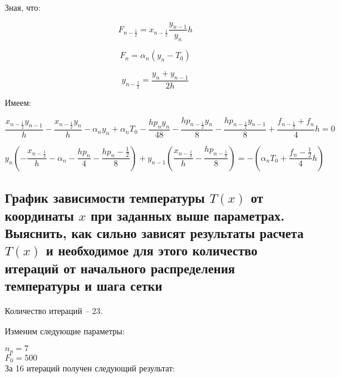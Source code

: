 Зная, что: 

\begin{equation*}
	F_{n - \frac{1}{2}} = x_{n - \frac{1}{2}} \frac{y_{n - 1}}{y_n}{h}
\end{equation*}

\begin{equation*}
	F_{n} = \alpha_{n}(y_{n} - T_{0})
\end{equation*}

\begin{equation*}
	y_{n - \frac{1}{2}} = \frac{y_{n} + y_{n - 1}}{2h}
\end{equation*}

Имеем:

\begin{equation*}
	\frac{x_{n - \frac{1}{2}} y_{n - 1}}{h} - \frac{x_{n - \frac{1}{2}}y_{n}}{h} - \alpha_{n}y_{n} + \alpha_{n} T_{0} - \frac{hp_{n}y_{n}}{48} - \frac{hp_{n - \frac{1}{2}}y_{n}}{8} - \frac{hp_{n - \frac{1}{2}}y_{n - 1}}{8} + \frac{f_{n - \frac{1}{2}} + f_{n}}{4}h = 0
\end{equation*}

\begin{equation*}
	y_{n}(-\frac{x_{n - \frac{1}{2}}}{h} - \alpha_{n} - \frac{hp_{n}}{4} - \frac{hp_{n} - \frac{1}{2}}{8}) + y_{n - 1}(\frac{x_{n - \frac{1}{2}}}{h} - \frac{hp_{n - \frac{1}{2}}}{8}) = -(\alpha_{n}T_{0} + \frac{f_{n} - \frac{1}{2}}{4}h)
\end{equation*}

\clearpage

\subsection{График зависимости температуры $T(x)$ от координаты $x$ при заданных выше параметрах. Выяснить, как сильно зависят результаты расчета $T(x)$ и необходимое для этого количество итераций от начального распределения температуры и шага сетки}


Количество итераций -- 23.

Изменим следующие параметры:

\indent $n_p = 7$\\
\indent $F_0 = 500$\\

За 16 итераций получен следующий результат:



